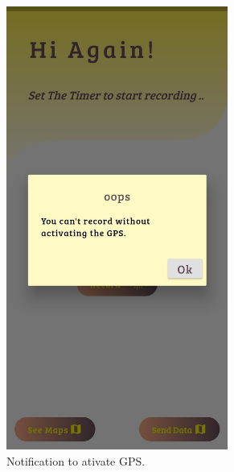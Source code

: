 \begin{itemize}
\begin{figure}[h!]
\begin{subfigure}{.49\textwidth}
            \includegraphics[width=0.8\textwidth]{Images/recordingApp/noGpsAlert.jpg}
            \caption{Notification to ativate GPS.}
            \label{fig:gpsNotif}
        \end{subfigure}
        \begin{subfigure}{.49\textwidth}
            \center

\end{subfigure}
\end{figure}
\end{itemize}
